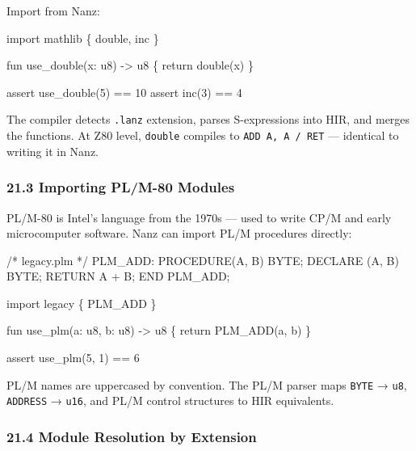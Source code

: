 \documentclass[
  11pt,
]{article}
\newenvironment{Shaded}{\begin{snugshade}}{\end{snugshade}}
\newcommand{\NormalTok}[1]{#1}
\begin{document}
Import from Nanz:

\begin{Shaded}
\begin{Highlighting}[]
\NormalTok{import mathlib \{ double, inc \}}

\NormalTok{fun use\_double(x: u8) {-}\textgreater{} u8 \{}
\NormalTok{    return double(x)}
\NormalTok{\}}

\NormalTok{assert use\_double(5) == 10}
\NormalTok{assert inc(3) == 4}
\end{Highlighting}
\end{Shaded}

The compiler detects \texttt{.lanz} extension, parses S-expressions into
HIR, and merges the functions. At Z80 level, \texttt{double} compiles to
\texttt{ADD\ A,\ A\ /\ RET} --- identical to writing it in Nanz.

\hypertarget{importing-plm-80-modules}{%
\subsubsection{21.3 Importing PL/M-80
Modules}\label{importing-plm-80-modules}}

PL/M-80 is Intel's language from the 1970s --- used to write CP/M and
early microcomputer software. Nanz can import PL/M procedures directly:

\begin{Shaded}
\begin{Highlighting}[]
\NormalTok{/* legacy.plm */}
\NormalTok{PLM\_ADD: PROCEDURE(A, B) BYTE;}
\NormalTok{    DECLARE (A, B) BYTE;}
\NormalTok{    RETURN A + B;}
\NormalTok{END PLM\_ADD;}
\end{Highlighting}
\end{Shaded}

\begin{Shaded}
\begin{Highlighting}[]
\NormalTok{import legacy \{ PLM\_ADD \}}

\NormalTok{fun use\_plm(a: u8, b: u8) {-}\textgreater{} u8 \{}
\NormalTok{    return PLM\_ADD(a, b)}
\NormalTok{\}}

\NormalTok{assert use\_plm(5, 1) == 6}
\end{Highlighting}
\end{Shaded}

PL/M names are uppercased by convention. The PL/M parser maps
\texttt{BYTE} → \texttt{u8}, \texttt{ADDRESS} → \texttt{u16}, and PL/M
control structures to HIR equivalents.

\hypertarget{module-resolution-by-extension}{%
\subsubsection{21.4 Module Resolution by
Extension}\label{module-resolution-by-extension}}
\end{document}
